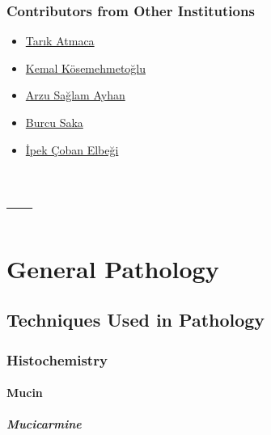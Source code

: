 \documentclass[
  letterpaper,
  paper=6in:9in,
  pagesize=pdftex,
  headinclude=on,
  footinclude=on,
  12pt]{scrbook}
\begin{document}
\hypertarget{sec-contributors-from-other-institutions}{%
\section*{Contributors from Other
Institutions}\label{sec-contributors-from-other-institutions}}


\begin{itemize}
\item
  \href{https://github.com/veterinarypathology3d}{Tarık Atmaca}
\item
  \href{https://hacettepepathology.com/}{Kemal Kösemehmetoğlu}
\item
  \href{https://www.hastane.hacettepe.edu.tr/115.html?drid=479}{Arzu
  Sağlam Ayhan}
\item
  \href{https://scholar.google.com.tr/citations?user=9e7r9yQAAAAJ}{Burcu
  Saka}
\item
  \href{https://www.florence.com.tr/prof-dr-ipek-coban-elbegi}{İpek
  Çoban Elbeği}
\end{itemize}

\part{---}

\part{General Pathology}

\hypertarget{sec-techniques-used-in-pathology}{%
\chapter{Techniques Used in
Pathology}\label{sec-techniques-used-in-pathology}}

\hypertarget{sec-histochemistry}{%
\section{Histochemistry}\label{sec-histochemistry}}

\hypertarget{sec-mucin}{%
\subsection{Mucin}\label{sec-mucin}}

\hypertarget{sec-mucicarmine}{%
\subsubsection{Mucicarmine}\label{sec-mucicarmine}}
\end{document}
